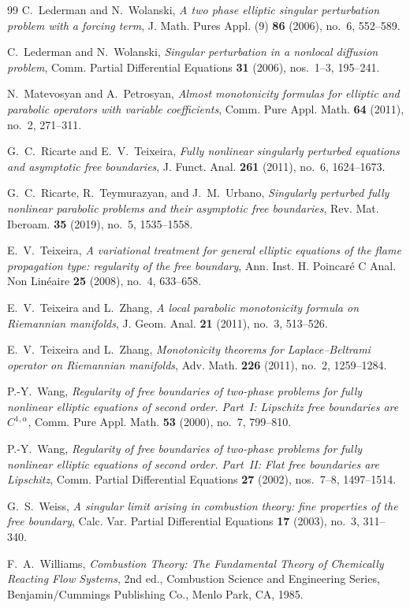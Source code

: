 \documentclass[11pt,letterpaper]{amsart}
\numberwithin{equation}{section}
\theoremstyle{definition}
\theoremstyle{remark}
\begin{document}
\begin{thebibliography}{99}
C.~Lederman and N.~Wolanski,
\emph{A two phase elliptic singular perturbation problem with a forcing term},
J. Math. Pures Appl. (9)
\textbf{86} (2006), no.~6, 552--589.

C.~Lederman and N.~Wolanski,
\emph{Singular perturbation in a nonlocal diffusion problem},
Comm. Partial Differential Equations
\textbf{31} (2006), nos.~1--3, 195--241.

N.~Matevosyan and A.~Petrosyan,
\emph{Almost monotonicity formulas for elliptic and parabolic operators with
variable coefficients},
Comm. Pure Appl. Math. \textbf{64} (2011), no.~2, 271--311.

G.~C.~Ricarte and E.~V.~Teixeira,
\emph{Fully nonlinear singularly perturbed equations and asymptotic free
boundaries},
J. Funct. Anal. \textbf{261} (2011), no.~6, 1624--1673.

G.~C.~Ricarte, R.~Teymurazyan, and J.~M.~Urbano,
\emph{Singularly perturbed fully nonlinear parabolic problems and their
asymptotic free boundaries},
Rev. Mat. Iberoam. \textbf{35} (2019), no.~5, 1535--1558.

E.~V.~Teixeira,
\emph{A variational treatment for general elliptic equations of the flame
propagation type: regularity of the free boundary},
Ann. Inst. H. Poincar\'e C Anal. Non Lin\'eaire
\textbf{25} (2008), no.~4, 633--658.

E.~V.~Teixeira and L.~Zhang,
\emph{A local parabolic monotonicity formula on Riemannian manifolds},
J. Geom. Anal. \textbf{21} (2011), no.~3, 513--526.

E.~V.~Teixeira and L.~Zhang,
\emph{Monotonicity theorems for Laplace--Beltrami operator on Riemannian
manifolds},
Adv. Math. \textbf{226} (2011), no.~2, 1259--1284.

P.-Y.~Wang,
\emph{Regularity of free boundaries of two-phase problems for fully nonlinear
elliptic equations of second order. Part~I: Lipschitz free boundaries are
$C^{1,\alpha}$},
Comm. Pure Appl. Math. \textbf{53} (2000), no.~7, 799--810.

P.-Y.~Wang,
\emph{Regularity of free boundaries of two-phase problems for fully nonlinear
elliptic equations of second order. Part~II: Flat free boundaries are
Lipschitz},
Comm. Partial Differential Equations \textbf{27} (2002), nos.~7--8,
1497--1514.

G.~S.~Weiss,
\emph{A singular limit arising in combustion theory: fine properties of the
free boundary},
Calc. Var. Partial Differential Equations
\textbf{17} (2003), no.~3, 311--340.

F.~A.~Williams,
\emph{Combustion Theory: The Fundamental Theory of Chemically Reacting
Flow Systems},
2nd ed., Combustion Science and Engineering Series,
Benjamin/Cummings Publishing Co., Menlo Park, CA, 1985.

\end{thebibliography}
\end{document}
